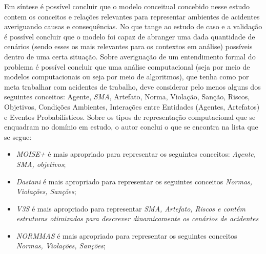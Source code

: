 Em síntese é possível concluir que o modelo conceitual concebido nesse estudo contem os conceitos e relações relevantes para representar ambientes de acidentes averiguando causas e consequências. No que tange ao estudo de caso e a validação é possível concluir que o modelo foi capaz de abranger uma dada quantidade de cenários (sendo esses os mais relevantes para os contextos em análise) possíveis dentro de uma certa situação. Sobre averiguação de um entendimento formal do problema é possível concluir que uma análise computacional (seja por meio de modelos computacionais ou seja por meio de algoritmos), que tenha como por meta trabalhar com acidentes de trabalho, deve considerar pelo menos alguns dos seguintes conceitos: Agente, \textit{SMA}, Artefato, Norma, Violação, Sanção, Riscos, Objetivos, Condições Ambientes, Interações entre Entidades (Agentes, Artefatos) e Eventos Probabilísticos. Sobre os tipos de representação computacional que se enquadram no domínio em estudo, o autor conclui o que se encontra na lista que se segue:
\begin{itemize}
    \item \textit{MOISE+} é mais apropriado para representar os seguintes conceitos: \textit{Agente, SMA, objetivos};
    \item \textit{Dastani} é mais apropriado para representar os seguintes conceitos \textit{Normas, Violações, Sanções};
    \item \textit{V3S} é mais apropriado para representar \textit{SMA, Artefato, Riscos e contém estruturas otimizadas para descrever dinamicamente os cenários de acidentes}
    \item \textit{NORMMAS} é mais apropriado para representar os seguintes conceitos \textit{Normas, Violações, Sanções};
\end{itemize}